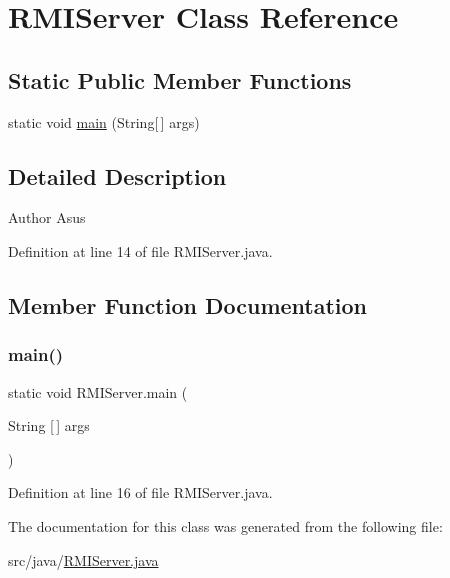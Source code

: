 \hypertarget{class_r_m_i_server}{}\section{R\+M\+I\+Server Class Reference}
\label{class_r_m_i_server}
\subsection*{Static Public Member Functions}
\begin{DoxyCompactItemize}
\item 
static void \mbox{\hyperlink{class_r_m_i_server_a8340d1833c0c4548d501460d3ec8be0f}{main}} (String\mbox{[}$\,$\mbox{]} args)
\end{DoxyCompactItemize}


\subsection{Detailed Description}
\begin{DoxyAuthor}{Author}
Asus 
\end{DoxyAuthor}


Definition at line 14 of file R\+M\+I\+Server.\+java.



\subsection{Member Function Documentation}
\mbox{\label{class_r_m_i_server_a8340d1833c0c4548d501460d3ec8be0f}} 
\subsubsection{\texorpdfstring{main()}{main()}}
{\footnotesize\ttfamily static void R\+M\+I\+Server.\+main (\begin{DoxyParamCaption}\item[{String \mbox{[}$\,$\mbox{]}}]{args }\end{DoxyParamCaption})\hspace{0.3cm}{\ttfamily [static]}}



Definition at line 16 of file R\+M\+I\+Server.\+java.



The documentation for this class was generated from the following file\+:\begin{DoxyCompactItemize}
\item 
src/java/\mbox{\hyperlink{_r_m_i_server_8java}{R\+M\+I\+Server.\+java}}\end{DoxyCompactItemize}
